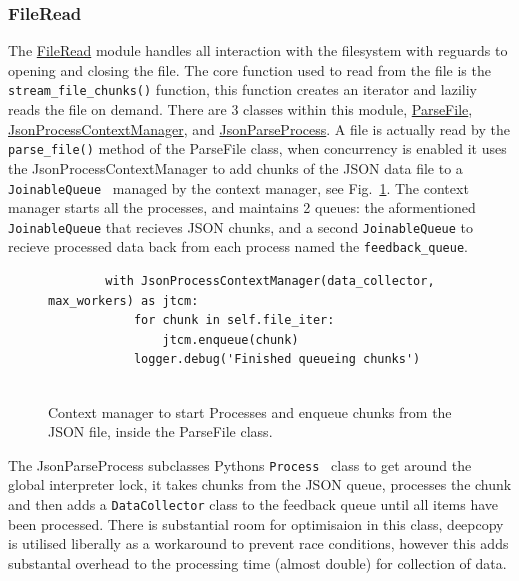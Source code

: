 \documentclass[11pt]{article}
\newcommand{\code}[1]{\colorbox{light-gray}{\texttt{#1}}}
\begin{document}
\subsubsection{FileRead}\label{sec:FileRead}
The \href{https://www2.macs.hw.ac.uk/~sf52/DocuTrace/html/DocuTrace.Analysis.html#module-DocuTrace.Analysis.FileRead}{FileRead} module handles all interaction with the filesystem with reguards to opening and closing the file. The core function used to read from the file is the \code{stream\_file\_chunks()} function, this function creates an iterator and laziliy reads the file on demand. 
There are 3 classes within this module, \href{https://www2.macs.hw.ac.uk/~sf52/DocuTrace/html/DocuTrace.Analysis.html#DocuTrace.Analysis.FileRead.ParseFile}{ParseFile}, \href{https://www2.macs.hw.ac.uk/~sf52/DocuTrace/html/DocuTrace.Analysis.html#DocuTrace.Analysis.FileRead.JsonProcessContextManager}{JsonProcessContextManager}, and \href{https://www2.macs.hw.ac.uk/~sf52/DocuTrace/html/DocuTrace.Analysis.html#DocuTrace.Analysis.FileRead.ParseFile}{JsonParseProcess}. 
A file is actually read by the \code{parse\_file()} method of the ParseFile class, when concurrency is enabled it uses the JsonProcessContextManager to add chunks of the JSON data file to a \code{JoinableQueue}~\autocite{MultiprocessingProcessbasedParallelism} managed by the context manager, see Fig.~\ref{fig:JSONPContextManager}.
The context manager starts all the processes, and maintains 2 queues: the aformentioned \code{JoinableQueue} that recieves JSON chunks, and a second \code{JoinableQueue} to recieve processed data back from each process named the \code{feedback\_queue}.

\begin{figure}[h]
    \begin{verbatim}
        with JsonProcessContextManager(data_collector, max_workers) as jtcm:
            for chunk in self.file_iter:
                jtcm.enqueue(chunk)
            logger.debug('Finished queueing chunks')
        
    \end{verbatim}
    \caption{Context manager to start Processes and enqueue chunks from the JSON file, inside the ParseFile class.}
    \label{fig:JSONPContextManager}
\end{figure}

The JsonParseProcess subclasses Pythons \code{Process}~\autocite{MultiprocessingProcessbasedParallelism} class to get around the global interpreter lock, it takes chunks from the JSON queue, processes the chunk and then adds a \code{DataCollector} class to the feedback queue until all items have been processed. 
There is substantial room for optimisaion in this class, deepcopy is utilised liberally as a workaround to prevent race conditions, however this adds substantal overhead to the processing time (almost double) for collection of data.
\end{document}
